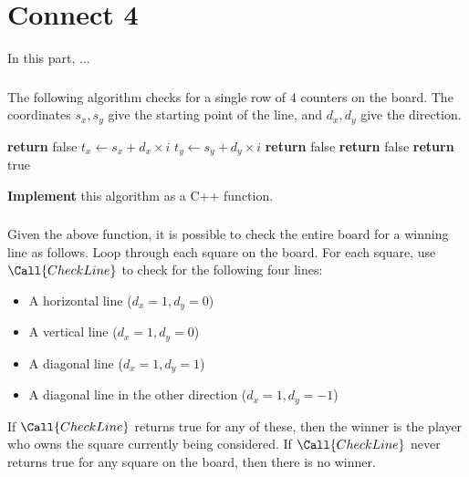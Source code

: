 \part{Connect 4}

In this part, ...

\section{} \label{core-b-first}

The following algorithm checks for a single row of $4$ counters on the board.
The coordinates $s_x, s_y$ give the starting point of the line,
and $d_x, d_y$ give the direction.

\begin{algorithm}
\begin{algorithmic}
            \State \textbf{return} false
        \EndIf
            \State $t_x \gets s_x + d_x \times i$
            \State $t_y \gets s_y + d_y \times i$
                \State \textbf{return} false
                \State \textbf{return} false
            \EndIf
        \EndFor
        \State \textbf{return} true
    \EndProcedure
\end{algorithmic}
\end{algorithm}

\textbf{Implement} this algorithm as a C++ function.

\section{}

Given the above function, it is possible to check the entire board for a winning line as follows.
Loop through each square on the board.
For each square, use $\Call{CheckLine}$ to check for the following four lines:
\begin{itemize}
\item A horizontal line ($d_x=1, d_y=0$)
\item A vertical line ($d_x=1, d_y=0$)
\item A diagonal line ($d_x=1, d_y=1$)
\item A diagonal line in the other direction ($d_x=1, d_y=-1$)
\end{itemize}
If $\Call{CheckLine}$ returns true for any of these, then the winner is the player who owns the square
currently being considered.
If $\Call{CheckLine}$ never returns true for any square on the board, then there is no winner.

